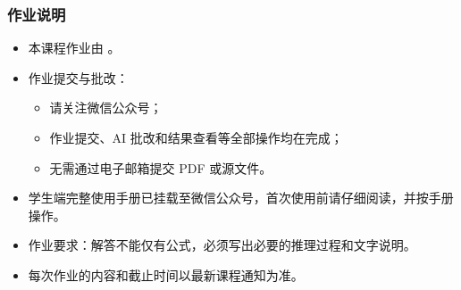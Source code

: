 \documentclass[Prob-All.tex]{subfiles}
\begin{document}
\begin{frame}
	\frametitle{作业说明}
	\small
	\begin{itemize}[<+-|alert@+>]
		\item 本课程作业由 。
		\item 作业提交与批改：
		\begin{itemize}[<+-|alert@+>]
			\item 请关注微信公众号；
			\item 作业提交、AI 批改和结果查看等全部操作均在完成；
			\item 无需通过电子邮箱提交 PDF 或源文件。
		\end{itemize}
		\item 学生端完整使用手册已挂载至微信公众号，首次使用前请仔细阅读，并按手册操作。
		\item 作业要求：解答不能仅有公式，必须写出必要的推理过程和文字说明。
		\item 每次作业的内容和截止时间以最新课程通知为准。
	\end{itemize}

\end{frame}










\end{document}
